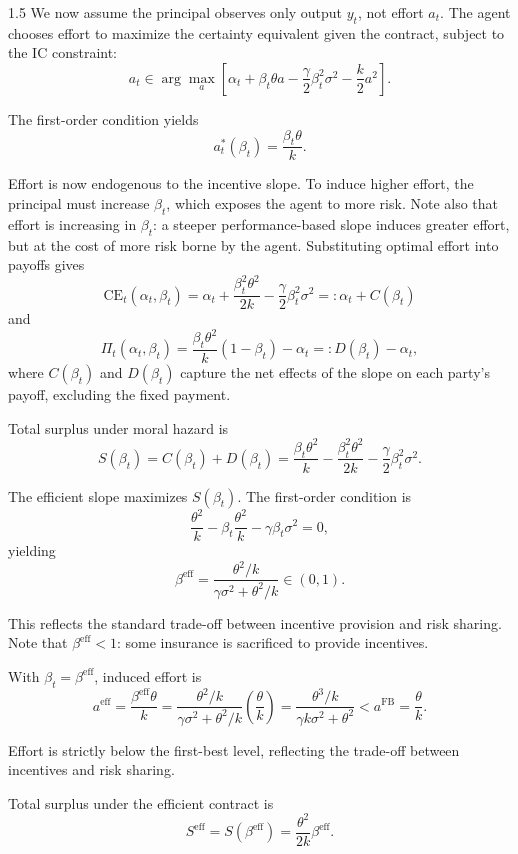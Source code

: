 \documentclass[12pt]{article}
\theoremstyle{definition}
\theoremstyle{plain}
\begin{document}
\begin{spacing}{1.5}
We now assume the principal observes only output $y_t$, not effort $a_t$. The agent chooses effort to maximize the certainty equivalent given the contract, subject to the IC constraint:
\[
a_t \in \arg\max_{a} \left[\alpha_t + \beta_t \theta a - \frac{\gamma}{2}\beta_t^2 \sigma^2 - \frac{k}{2}a^2\right].
\]

The first-order condition yields
\[
a_t^*(\beta_t) = \frac{\beta_t \theta}{k}.
\]

Effort is now endogenous to the incentive slope. To induce higher effort, the principal must increase $\beta_t$, which exposes the agent to more risk. Note also that effort is increasing in $\beta_t$: a steeper performance-based slope induces greater effort, but at the cost of more risk borne by the agent. Substituting optimal effort into payoffs gives
\[
\text{CE}_t(\alpha_t, \beta_t) = \alpha_t + \frac{\beta_t^2 \theta^2}{2k} - \frac{\gamma}{2}\beta_t^2 \sigma^2 =: \alpha_t + C(\beta_t)
\]
and
\[
\Pi_t(\alpha_t, \beta_t) = \frac{\beta_t \theta^2}{k}(1-\beta_t) - \alpha_t =: D(\beta_t) - \alpha_t,
\]
where $C(\beta_t)$ and $D(\beta_t)$ capture the net effects of the slope on each party's payoff, excluding the fixed payment.

Total surplus under moral hazard is
\[
S(\beta_t) = C(\beta_t) + D(\beta_t) = \frac{\beta_t \theta^2}{k} - \frac{\beta_t^2 \theta^2}{2k} - \frac{\gamma}{2}\beta_t^2 \sigma^2.
\]

The efficient slope maximizes $S(\beta_t)$. The first-order condition is
\[
\frac{\theta^2}{k} - \beta_t \frac{\theta^2}{k} - \gamma \beta_t \sigma^2 = 0,
\]
yielding
\[
\beta^{\text{eff}} = \frac{\theta^2/k}{\gamma \sigma^2 + \theta^2/k} \in (0,1).
\]

This reflects the standard trade-off between incentive provision and risk sharing. Note that $\beta^{\text{eff}} < 1$: some insurance is sacrificed to provide incentives.

With $\beta_t = \beta^{\text{eff}}$, induced effort is
\[
a^{\text{eff}} = \frac{\beta^{\text{eff}} \theta}{k} = \frac{\theta^2/k}{\gamma \sigma^2 + \theta^2/k} \left(\frac{\theta}{k}\right) = \frac{\theta^3/k}{\gamma k \sigma^2 + \theta^2} < a^{\text{FB}} = \frac{\theta}{k}.
\]

Effort is strictly below the first-best level, reflecting the trade-off between incentives and risk sharing.

Total surplus under the efficient contract is
\[
S^{\text{eff}} = S(\beta^{\text{eff}}) = \frac{\theta^2}{2k} \beta^{\text{eff}}.
\]


\end{spacing}
\end{document}
